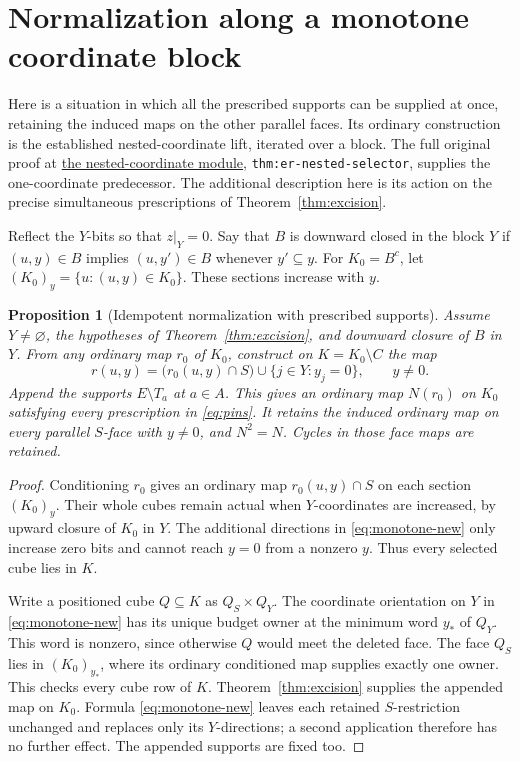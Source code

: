 \documentclass[11pt]{article}
\newtheorem{proposition}[theorem]{Proposition}
\theoremstyle{definition}
\begin{document}
\section{Normalization along a monotone coordinate block}
\label{sec:monotone-normalization}
Here is a situation in which all the prescribed supports can be supplied
at once, retaining the induced maps on the other parallel faces. Its
ordinary construction is the established nested-coordinate lift, iterated
over a block. The full original proof at
\href{../../containment-ext-rep/sections/nested_coordinate.tex}{the nested-coordinate module},
\texttt{thm:er-nested-selector}, supplies the one-coordinate predecessor.
The additional description here is its action on the precise simultaneous
prescriptions of Theorem~\ref{thm:excision}.

Reflect the $Y$-bits so that $z|_Y=0$. Say that $B$ is downward closed
in the block $Y$ if $(u,y)\in B$ implies $(u,y')\in B$ whenever
$y'\subseteq y$. For $K_0=B^c$, let
$(K_0)_y=\{u:(u,y)\in K_0\}$. These sections increase with $y$.

\begin{proposition}[Idempotent normalization with prescribed supports]
\label{prop:monotone-retraction}
Assume $Y\ne\varnothing$, the hypotheses of Theorem~\ref{thm:excision},
and downward closure of $B$ in $Y$. From any ordinary map $r_0$ of
$K_0$, construct on $K=K_0\setminus C$ the map
\begin{equation}\label{eq:monotone-new}
 r(u,y)=\bigl(r_0(u,y)\cap S\bigr)
               \cup\{j\in Y:y_j=0\},\qquad y\ne0.
\end{equation}
Append the supports $E\setminus T_a$ at $a\in A$.
This gives an ordinary map $N(r_0)$ on $K_0$ satisfying every prescription
in \eqref{eq:pins}. It retains the induced ordinary map on every parallel
$S$-face with $y\ne0$, and $N^2=N$. Cycles in those face maps are retained.
\end{proposition}
\begin{proof}
Conditioning $r_0$ gives an ordinary map $r_0(u,y)\cap S$ on each
section $(K_0)_y$. Their whole cubes remain actual when $Y$-coordinates
are increased, by upward closure of $K_0$ in $Y$. The additional
directions in \eqref{eq:monotone-new} only increase zero bits and cannot
reach $y=0$ from a nonzero $y$. Thus every selected cube lies in $K$.

Write a positioned cube $Q\subseteq K$ as $Q_S\times Q_Y$.
The coordinate orientation on $Y$ in \eqref{eq:monotone-new} has its
unique budget owner at the minimum word $y_*$ of $Q_Y$. This word
is nonzero, since otherwise $Q$ would meet the deleted face.
The face $Q_S$ lies in $(K_0)_{y_*}$, where its ordinary conditioned
map supplies exactly one owner. This checks every cube row of $K$.
Theorem~\ref{thm:excision} supplies the appended map on $K_0$.
Formula \eqref{eq:monotone-new} leaves each retained $S$-restriction
unchanged and replaces only its $Y$-directions; a second application
therefore has no further effect. The appended supports are fixed too.
\end{proof}
\end{document}
